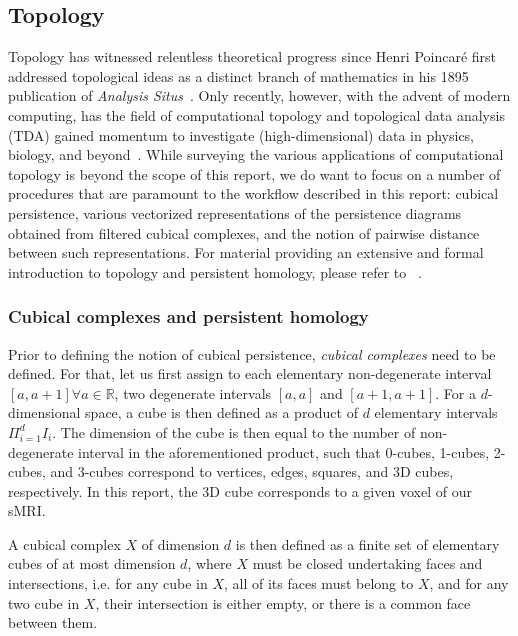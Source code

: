 \documentclass{article}
\begin{document}
\subsection{Topology}

Topology has witnessed relentless theoretical progress since Henri Poincaré first addressed topological ideas as a distinct branch of mathematics in his 1895 publication of \textit{Analysis Situs}~\citep{poincare1895analysis, james1999history}. Only recently, however, with the advent of modern computing, has the field of computational topology and topological data analysis (TDA) gained momentum to investigate (high-dimensional) data in physics, biology, and beyond~\citep{ghrist2008barcodes, dey1999computational, amezquita2020shape}. While surveying the various applications of computational topology is beyond the scope of this report, we do want to focus on a number of procedures that are paramount to the workflow described in this report: cubical persistence, various vectorized representations of the persistence diagrams obtained from filtered cubical complexes, and the notion of pairwise distance between such representations. For material providing an extensive and formal introduction to topology and persistent homology, please refer to ~\citep{freedman2009algebraic, edelsbrunner2010computational, ghrist2008barcodes}.


\subsubsection{Cubical complexes and persistent homology}

Prior to defining the notion of cubical persistence, \emph{cubical complexes} need to be defined. For that, let us first assign to each elementary non-degenerate interval $[a,a+1]\forall a\in\mathbb{R}$, two degenerate intervals $[a,a]$ and $[a+1,a+1]$. For a $d$-dimensional space, a cube is then defined as a product of $d$ elementary intervals $\Pi_{i=1}^{d}I_i$. The dimension of the cube is then equal to the number of non-degenerate interval in the aforementioned product, such that 0-cubes, 1-cubes, 2-cubes, and 3-cubes correspond to vertices, edges, squares, and 3D cubes, respectively. In this report, the 3D cube corresponds to a given voxel of our sMRI.

A cubical complex $X$ of dimension $d$ is then defined as a finite set of elementary cubes of at most dimension $d$, where $X$ must be closed undertaking faces and intersections, i.e. for any cube in $X$, all of its faces must belong to $X$, and for any two cube in $X$, their intersection is either empty, or there is a common face between them.
\end{document}
